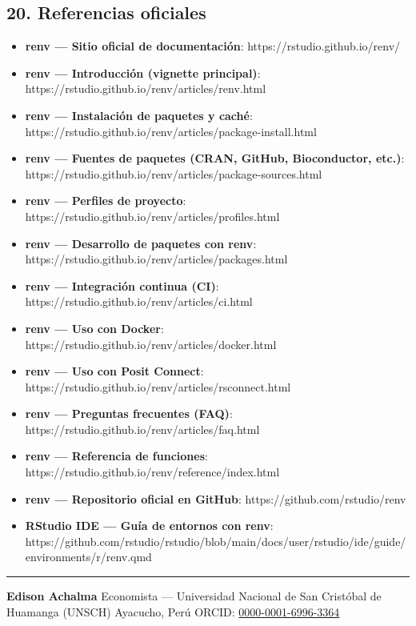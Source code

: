 \documentclass[
  man,
  floatsintext,
  longtable,
  a4paper,
  nolmodern,
  notxfonts,
  notimes,
  12pt,
  colorlinks=true,linkcolor=blue,citecolor=blue,urlcolor=blue]{apa7}
\providecommand{\tightlist}{%
  \setlength{\itemsep}{0pt}\setlength{\parskip}{0pt}}
\begin{document}
\subsection{20. Referencias oficiales}\label{referencias-oficiales}

\begin{itemize}
\tightlist
\item
  \textbf{renv --- Sitio oficial de documentación}:
  https://rstudio.github.io/renv/
\item
  \textbf{renv --- Introducción (vignette principal)}:
  https://rstudio.github.io/renv/articles/renv.html
\item
  \textbf{renv --- Instalación de paquetes y caché}:
  https://rstudio.github.io/renv/articles/package-install.html
\item
  \textbf{renv --- Fuentes de paquetes (CRAN, GitHub, Bioconductor,
  etc.)}: https://rstudio.github.io/renv/articles/package-sources.html
\item
  \textbf{renv --- Perfiles de proyecto}:
  https://rstudio.github.io/renv/articles/profiles.html
\item
  \textbf{renv --- Desarrollo de paquetes con renv}:
  https://rstudio.github.io/renv/articles/packages.html
\item
  \textbf{renv --- Integración continua (CI)}:
  https://rstudio.github.io/renv/articles/ci.html
\item
  \textbf{renv --- Uso con Docker}:
  https://rstudio.github.io/renv/articles/docker.html
\item
  \textbf{renv --- Uso con Posit Connect}:
  https://rstudio.github.io/renv/articles/rsconnect.html
\item
  \textbf{renv --- Preguntas frecuentes (FAQ)}:
  https://rstudio.github.io/renv/articles/faq.html
\item
  \textbf{renv --- Referencia de funciones}:
  https://rstudio.github.io/renv/reference/index.html
\item
  \textbf{renv --- Repositorio oficial en GitHub}:
  https://github.com/rstudio/renv
\item
  \textbf{RStudio IDE --- Guía de entornos con renv}:
  https://github.com/rstudio/rstudio/blob/main/docs/user/rstudio/ide/guide/environments/r/renv.qmd
\end{itemize}

\begin{center}\rule{0.5\linewidth}{0.5pt}\end{center}

\textbf{Edison Achalma} Economista --- Universidad Nacional de San
Cristóbal de Huamanga (UNSCH) Ayacucho, Perú ORCID:
\href{https://orcid.org/0000-0001-6996-3364}{0000-0001-6996-3364}
\end{document}
